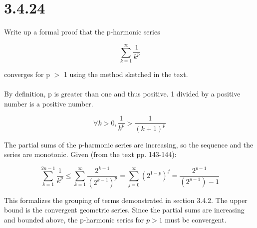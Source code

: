 \documentclass{article}
\begin{document}
\section{3.4.24}

Write up a formal proof that the p-harmonic series

\begin{equation}
	\sum_{k=1}^{\infty} \frac{1}{k^p}
\end{equation}

converges for p $>$ 1 using the method sketched in the text.

\paragraph{}

By definition, p is greater than one and thus positive.
1 divided by a positive number is a positive number.

\begin{equation}
	\forall k > 0, \frac{1}{k^p} > \frac {1}{(k+1)^p}
\end{equation}

The partial sums of the p-harmonic series are increasing, so the sequence and the series are monotonic.
Given (from the text pp. 143-144):

\begin{equation}
	\sum_{k=1}^{2n-1} \frac{1}{k^p} \le \sum_{k=1}^{\infty} \frac{2^{k-1}}{(2^{k-1})^p}
	= \sum_{j=0}^{\infty} (2^{1-p})^j = \frac{2^{p-1}}{(2^{p-1})-1}
\end{equation}

This formalizes the grouping of terms demonstrated in section 3.4.2.
The upper bound is the convergent geometric series.
Since the partial sums are increasing and bounded above, the p-harmonic series for $p > 1$ must be convergent.
\end{document}
